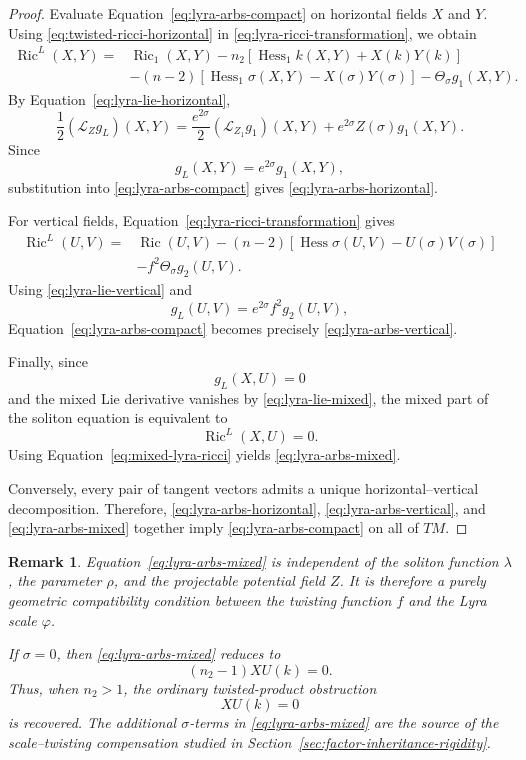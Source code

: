 \documentclass[a4paper,11pt]{article}
\theoremstyle{plain}
\newtheorem{remark}{Remark}[section]
\numberwithin{equation}{section}
\begin{document}
\begin{proof}
	Evaluate Equation~\eqref{eq:lyra-arbs-compact} on horizontal
	fields \(X\) and \(Y\). Using
	\eqref{eq:twisted-ricci-horizontal} in
	\eqref{eq:lyra-ricci-transformation}, we obtain
	\begin{align*}
		\operatorname{Ric}^{L}(X,Y)
		={}&
		\operatorname{Ric}_{1}(X,Y)
		-
		n_{2}
		\left[
		\operatorname{Hess}_{1}k(X,Y)
		+
		X(k)Y(k)
		\right]
		\\
		&-
		(n-2)
		\left[
		\operatorname{Hess}_{1}\sigma(X,Y)
		-
		X(\sigma)Y(\sigma)
		\right]
		-
		\Theta_{\sigma}g_{1}(X,Y).
	\end{align*}
	By Equation~\eqref{eq:lyra-lie-horizontal},
	\[
	\frac{1}{2}
	(\mathcal L_{Z}g_{L})(X,Y)
	=
	\frac{e^{2\sigma}}{2}
	(\mathcal L_{Z_{1}}g_{1})(X,Y)
	+
	e^{2\sigma}Z(\sigma)g_{1}(X,Y).
	\]
	Since
	\[
	g_{L}(X,Y)
	=
	e^{2\sigma}g_{1}(X,Y),
	\]
	substitution into \eqref{eq:lyra-arbs-compact} gives
	\eqref{eq:lyra-arbs-horizontal}.
	
	For vertical fields, Equation~\eqref{eq:lyra-ricci-transformation}
	gives
	\begin{align*}
		\operatorname{Ric}^{L}(U,V)
		={}&
		\operatorname{Ric}(U,V)
		-
		(n-2)
		\left[
		\operatorname{Hess}\sigma(U,V)
		-
		U(\sigma)V(\sigma)
		\right]
		\\
		&-
		f^{2}\Theta_{\sigma}g_{2}(U,V).
	\end{align*}
	Using \eqref{eq:lyra-lie-vertical} and
	\[
	g_{L}(U,V)
	=
	e^{2\sigma}f^{2}g_{2}(U,V),
	\]
	Equation~\eqref{eq:lyra-arbs-compact} becomes precisely
	\eqref{eq:lyra-arbs-vertical}.
	
	Finally, since
	\[
	g_{L}(X,U)=0
	\]
	and the mixed Lie derivative vanishes by
	\eqref{eq:lyra-lie-mixed}, the mixed part of the soliton equation
	is equivalent to
	\[
	\operatorname{Ric}^{L}(X,U)=0.
	\]
	Using Equation~\eqref{eq:mixed-lyra-ricci} yields
	\eqref{eq:lyra-arbs-mixed}.
	
	Conversely, every pair of tangent vectors admits a unique
	horizontal--vertical decomposition. Therefore,
	\eqref{eq:lyra-arbs-horizontal},
	\eqref{eq:lyra-arbs-vertical}, and
	\eqref{eq:lyra-arbs-mixed} together imply
	\eqref{eq:lyra-arbs-compact} on all of \(TM\).
\end{proof}

\begin{remark}
	\label{rem:mixed-scale-twisting}
	Equation~\eqref{eq:lyra-arbs-mixed} is independent of the
	soliton function \(\lambda\), the parameter \(\rho\), and the
	projectable potential field \(Z\). It is therefore a purely
	geometric compatibility condition between the twisting function
	\(f\) and the Lyra scale \(\varphi\).
	
	If \(\sigma=0\), then
	\eqref{eq:lyra-arbs-mixed} reduces to
	\[
	(n_{2}-1)XU(k)=0.
	\]
	Thus, when \(n_{2}>1\), the ordinary twisted-product obstruction
	\[
	XU(k)=0
	\]
	is recovered. The additional \(\sigma\)-terms in
	\eqref{eq:lyra-arbs-mixed} are the source of the
	scale--twisting compensation studied in
	Section~\ref{sec:factor-inheritance-rigidity}.
\end{remark}
\end{document}
